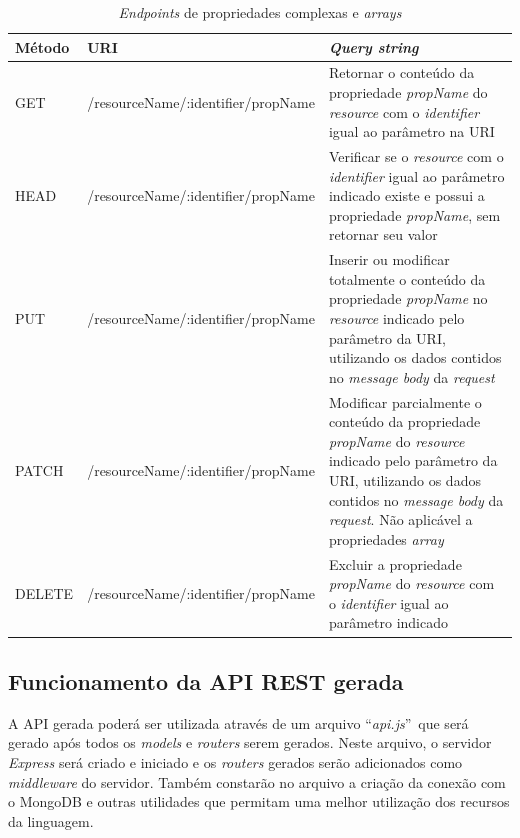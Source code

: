 \begin{table}[]
    \centering
    \begin{tabularx}{\textwidth}{|l|l|X|}
        \hline
        \textbf{Método} & \textbf{URI} & \textbf{\textit{Query string}} \\
        \hline

        GET & /resourceName/:identifier/propName & Retornar o conteúdo da propriedade \textit{propName} do \textit{resource} com o \textit{identifier} igual ao parâmetro na URI\\
        \hline

        HEAD & /resourceName/:identifier/propName & Verificar se o \textit{resource} com o \textit{identifier} igual ao parâmetro indicado existe e possui a propriedade \textit{propName}, sem retornar seu valor\\
        \hline

        PUT & /resourceName/:identifier/propName & Inserir ou modificar totalmente o conteúdo da propriedade \textit{propName} no \textit{resource} indicado pelo parâmetro da URI, utilizando os dados contidos no \textit{message body} da \textit{request}\\
        \hline

        PATCH & /resourceName/:identifier/propName & Modificar parcialmente o conteúdo da propriedade \textit{propName} do \textit{resource} indicado pelo parâmetro da URI, utilizando os dados contidos no \textit{message body} da \textit{request}. Não aplicável a propriedades \textit{array}\\
        \hline

        DELETE & /resourceName/:identifier/propName & Excluir a propriedade \textit{propName} do \textit{resource} com o \textit{identifier} igual ao parâmetro indicado\\
        \hline
        \hline
    \end{tabularx}
    \caption{\textit{Endpoints} de propriedades complexas e \textit{arrays}}
    \label{tab:end_prop}
\end{table}



\subsection{Funcionamento da API REST gerada}

A API gerada poderá ser utilizada através de um arquivo ``\textit{api.js}''\ que será gerado após todos os \textit{models} e \textit{routers} serem gerados. Neste arquivo, o servidor \textit{Express} será criado e iniciado e os \textit{routers} gerados serão adicionados como \textit{middleware} do servidor. Também constarão no arquivo a criação da conexão com o MongoDB e outras utilidades que permitam uma melhor utilização dos recursos da linguagem.

